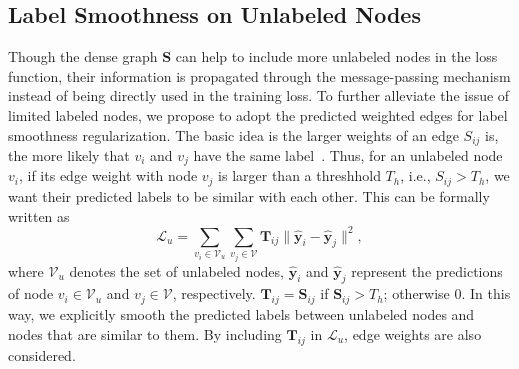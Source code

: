 \subsection{Label Smoothness on Unlabeled Nodes}
Though the dense graph $\mathbf{S}$ can help to include more unlabeled nodes in the loss function, their information is propagated through the message-passing mechanism instead of being directly used in the training loss. To further alleviate the issue of limited labeled nodes, we  propose to adopt the predicted weighted edges for label smoothness regularization. The basic idea is the larger weights of an edge $S_{ij}$ is, the more likely that $v_i$ and $v_j$ have the same label~\cite{wang2019knowledge}.
Thus, for an unlabeled node $v_i$, if its edge weight with node $v_j$ is larger than a threshhold $T_h$, i.e., $S_{ij} > T_h$, we want their predicted labels to be similar with each other. This can be formally written as
\begin{equation}
    \mathcal{L}_u = \sum_{v_i \in \mathcal{V}_u}\sum_{v_j \in \mathcal{V}} \mathbf{T}_{ij} \|\mathbf{\hat{y}}_i-\mathbf{\hat{y}}_j\|^2,
\end{equation}
where $\mathcal{V}_u$ denotes the set of unlabeled nodes, $\mathbf{\hat{y}}_i$ and $\mathbf{\hat{y}}_j$ represent the predictions of node $v_i \in \mathcal{V}_u$ and $v_j \in \mathcal{V}$, respectively. $\mathbf{T}_{ij}=\mathbf{S}_{ij}$ if $\mathbf{S}_{ij}>T_h$; otherwise 0.
In this way, we explicitly smooth the predicted labels between unlabeled nodes and nodes that are similar to them. By including $\mathbf{T}_{ij}$ in $\mathcal{L}_u$, edge weights are also considered. 

